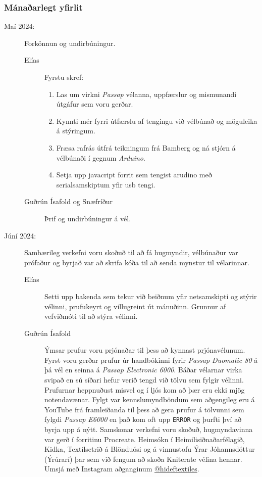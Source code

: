 \documentclass[a4paper,12pt,twoside]{article}
\begin{document}
\subsubsection{Mánaðarlegt yfirlit}
\begin{description}
    \item[Maí 2024:] Forkönnun og undirbúningur.  
    \begin{description}
        \item[Elías] Fyrstu skref:
        \begin{enumerate}
            \item Las um virkni \textit{Passap} vélanna, uppfærslur og mismunandi útgáfur sem voru gerðar.
            \item Kynnti mér fyrri útfærslu af tengingu við vélbúnað og möguleika á stýringum.
            \item Fræsa rafrás útfrá teikningum frá Bamberg \cite{bamberg} og ná stjórn á vélbúnaði í gegnum \textit{Arduino}.
            \item Setja upp javacript forrit sem tengist arudino með serialsamskiptum yfir usb tengi.
        \end{enumerate}
        \item[Guðrún Ísafold og Snæfríður] Þrif og undirbúningur á vél.
    \end{description}
    \item[Júní 2024:] Sambærileg verkefni voru skoðuð til að fá hugmyndir, vélbúnaður var prófaður og byrjað var að skrifa kóða til að senda mynstur til vélarinnar.
    \begin{description}
        \item[Elías] Setti upp bakenda sem tekur við beiðnum yfir netsamskipti og stýrir vélinni, prufukeyrt og villugreint út mánuðinn. Grunnur af vefviðmóti til að stýra vélinni.
        \item[Guðrún Ísafold] Ýmsar prufur voru prjónaðar til þess að kynnast prjónavélunum. Fyrst voru gerðar prufur úr handbókinni fyrir \textit{Passap Duomatic 80} á þá vél en seinna á \textit{Passap Electronic 6000}. Báðar vélarnar virka svipað en sú síðari hefur verið tengd við tölvu sem fylgir vélinni. Prufurnar heppnuðust misvel og í ljós kom að þær eru ekki mjög notendavænar. Fylgt var kennslumyndböndum sem aðgengileg eru á YouTube frá framleiðanda til þess að gera prufur á tölvunni sem fylgdi \textit{Passap E6000} en það kom oft upp \texttt{ERROR} og þurfti því að byrja upp á nýtt. Samskonar verkefni voru skoðuð, hugmyndavinna var gerð í forritinu Procreate. Heimsókn í Heimilisiðnaðarfélagið, Kidka, Textílsetrið á Blönduósi og á vinnustofu Ýrar Jóhannsdóttur (Ýrúrarí) þar sem við fengum að skoða Kniterate vélina hennar. Umsjá með Instagram aðganginum \href{https://www.instagram.com/hideftextiles/}{@hideftextiles}.

\end{description}
\end{description}
\end{document}
